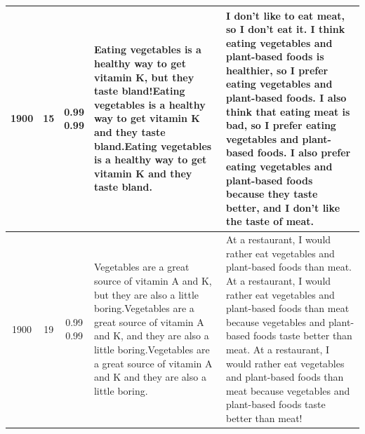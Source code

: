 \begin{table}[H]
\begin{center}
{\begin{tabular}{cccp{5cm}p{5cm}}
    \midrule
    1900 &  15 & \makecell[t]{0.99 \\ 0.99} & Eating vegetables is a healthy way to get vitamin K, but they taste bland!Eating vegetables is a healthy way to get vitamin K and they taste bland.Eating vegetables is a healthy way to get vitamin K and they taste bland. & I don't like to eat meat, so I don't eat it. I think eating vegetables and plant-based foods is healthier, so I prefer eating vegetables and plant-based foods. I also think that eating meat is bad, so I prefer eating vegetables and plant-based foods. I also prefer eating vegetables and plant-based foods because they taste better, and I don't like the taste of meat. \\
    \midrule
    1900 & 19 & \makecell[t]{0.99 \\ 0.99} & Vegetables are a great source of vitamin A and K, but they are also a little boring.Vegetables are a great source of vitamin A and K, and they are also a little boring.Vegetables are a great source of vitamin A and K and they are also a little boring. & At a restaurant, I would rather eat vegetables and plant-based foods than meat. At a restaurant, I would rather eat vegetables and plant-based foods than meat because vegetables and plant-based foods taste better than meat. At a restaurant, I would rather eat vegetables and plant-based foods than meat because vegetables and plant-based foods taste better than meat! \\
    \bottomrule
  \end{tabular}}
  \end{center}
\end{table}

